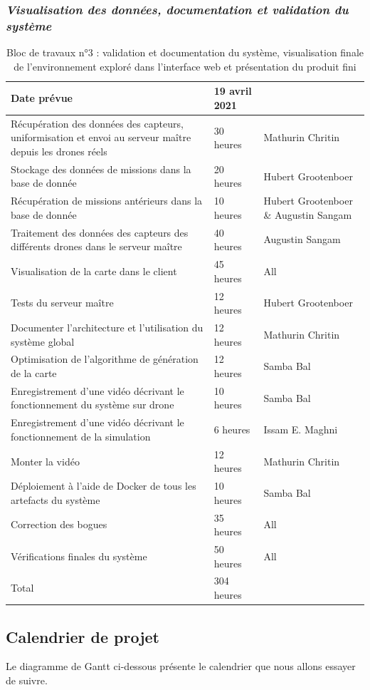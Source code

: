 \documentclass{mistcoursedoc}
\begin{document}
\newpage\subsubsection{\emph{Visualisation des données, documentation et validation du système}}
\begin{table}[h!]
  \centering
  \begin{tabular}{M{7cm}M{3cm}M{3.5cm}}\hline
    Date prévue                                                           & 19 avril 2021  & \tabularnewline\hline
    Récupération des données des capteurs, uniformisation et envoi au serveur maître depuis les drones réels & 30 heures & Mathurin Chritin \tabularnewline
    Stockage des données de missions dans la base de donnée     & 20 heures & Hubert Grootenboer \tabularnewline
    Récupération de missions antérieurs dans la base de donnée     & 10 heures & Hubert Grootenboer \& Augustin Sangam \tabularnewline
    Traitement des données des capteurs des différents drones dans le serveur maître & 40 heures & Augustin Sangam \tabularnewline
    Visualisation de la carte dans le client                           &    45 heures     & All \tabularnewline
    Tests du serveur maître & 12 heures & Hubert Grootenboer \tabularnewline
    Documenter l’architecture et l’utilisation du système global          & 12 heures & Mathurin Chritin \tabularnewline
    Optimisation de l’algorithme de génération de la carte                   & 12 heures & Samba Bal \tabularnewline
    Enregistrement d'une vidéo décrivant le fonctionnement du système sur drone & 10 heures & Samba Bal \tabularnewline
    Enregistrement d'une vidéo décrivant le fonctionnement de la simulation     & 6 heures & Issam E. Maghni \tabularnewline
    Monter la vidéo                                                          &     12 heures     & Mathurin Chritin \tabularnewline
    Déploiement à l'aide de Docker de tous les artefacts du système       & 10 heures & Samba Bal\tabularnewline
    Correction des bogues                                                   & 35 heures & All\tabularnewline
    Vérifications finales du système                                          &  50 heures & All \tabularnewline\hline
    Total & 304 heures & \tabularnewline\hline
  \end{tabular}
  \caption{Bloc de travaux n°3 : validation et documentation du système, visualisation finale de l'environnement exploré dans l'interface web et présentation du produit fini}
\end{table}

\newpage
\subsection{Calendrier de projet}\label{calendrier}
Le diagramme de Gantt ci-dessous présente le calendrier que nous allons essayer de suivre.
\end{document}
